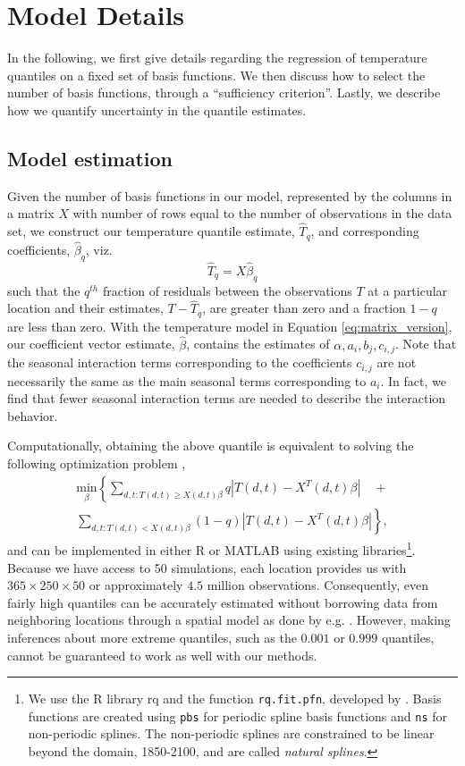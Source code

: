\documentclass{ametsoc}
\begin{document}
\section{Model Details}
\label{app:model}

In the following, we first give details regarding the regression of temperature quantiles on a fixed set of basis functions. We then discuss how to select the number of basis functions, through a ``sufficiency criterion''. Lastly, we describe how we quantify uncertainty in the quantile estimates.

 \subsection{Model estimation}
 Given the number of basis functions in our model, represented by the columns in a matrix $X$ with number of rows equal to the number of observations in the data set,  we construct our temperature quantile estimate, $\hat{T}_q$, and corresponding coefficients, $\hat{\beta}_q$, viz.
 \begin{equation}
 \hat{T}_q = X\hat{\beta}_q
 \end{equation}
such that the $q^{th}$ fraction of residuals between the observations $T$ at a particular location and their estimates, $T - \hat{T}_q$, are greater than zero and a fraction $1-q$ are less than zero. With the temperature model in Equation \ref{eq:matrix_version}, our coefficient vector estimate, $\hat{\beta}$, contains the estimates of $\alpha,a_i, b_j, c_{i,j}$. Note that the seasonal interaction terms corresponding to the coefficients $c_{i,j}$ are not necessarily the same as the main seasonal terms corresponding to $a_i$. In fact, we find that fewer seasonal interaction terms are needed to describe the interaction behavior. 

Computationally, obtaining the above quantile is equivalent to solving the following optimization problem \citep{koenker1978regression},
\begin{multline}
\underset{\beta}{\text{min}}\left\{ \sum_{d,t: T(d, t) \geq X(d, t)\beta} q|T(d,t) - X^T(d,t)\beta| \right. \quad+  \\
 \left. \sum_{d,t: T(d, t) < X(d, t)\beta} (1 - q)|T(d,t) - X^T(d,t)\beta| \right\},
\end{multline}
and can be implemented in either R or MATLAB using existing libraries\footnote{We use the R library rq and the function \texttt{rq.fit.pfn}, developed by \citet{portnoy1997gaussian}. Basis functions are created using \texttt{pbs} for periodic spline basis functions and \texttt{ns} for non-periodic splines. The non-periodic splines are constrained to be linear beyond the domain, 1850-2100, and are called \emph{natural splines}.}. Because we have access to 50 simulations, each location provides us with $365 \times 250 \times 50$ or approximately $4.5$ million observations. Consequently, even fairly high quantiles can be accurately estimated without borrowing data from neighboring locations through a spatial model as done by e.g. \citet{reich2011bayesian}. However, making inferences about more extreme quantiles, such as the  $0.001$ or $0.999$ quantiles, cannot be guaranteed to work as well with our methods.
\end{document}
